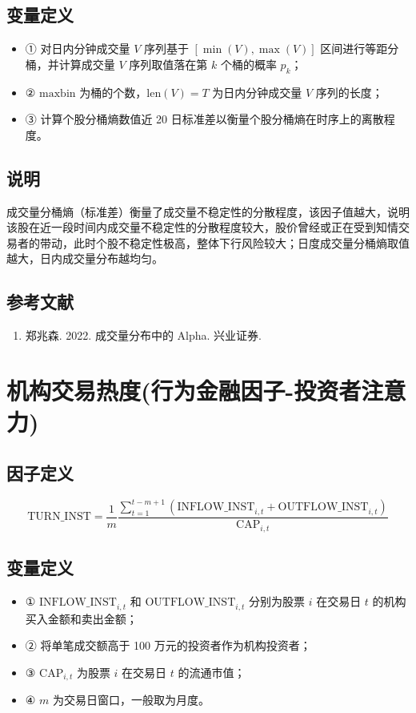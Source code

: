 \documentclass{article}
\begin{document}
\subsection{变量定义}
\begin{itemize}
    \item ① 对日内分钟成交量 \( V \) 序列基于 \([\min(V), \max(V)]\) 区间进行等距分桶，并计算成交量 \( V \) 序列取值落在第 \( k \) 个桶的概率 \( p_k \)；
    \item ② \( \mathrm{maxbin} \) 为桶的个数，\( \mathrm{len}(V) = T \) 为日内分钟成交量 \( V \) 序列的长度；
    \item ③ 计算个股分桶熵数值近 20 日标准差以衡量个股分桶熵在时序上的离散程度。
\end{itemize}

\subsection{说明}
成交量分桶熵（标准差）衡量了成交量不稳定性的分散程度，该因子值越大，说明该股在近一段时间内成交量不稳定性的分散程度较大，股价曾经或正在受到知情交易者的带动，此时个股不稳定性极高，整体下行风险较大；日度成交量分桶熵取值越大，日内成交量分布越均匀。

\subsection{参考文献}
\begin{enumerate}
    \item 郑兆森. 2022. 成交量分布中的 Alpha. 兴业证券.
\end{enumerate}

\section{机构交易热度(行为金融因子-投资者注意力)}

\subsection{因子定义}
\begin{equation}
    \mathrm{TURN\_INST} = \frac{1}{m}\frac{ \sum_{t=1}^{t-m+1} \left( \mathrm{INFLOW\_INST}_{i,t} + \mathrm{OUTFLOW\_INST}_{i,t} \right)}{\mathrm{CAP}_{i,t}}
\end{equation}

\subsection{变量定义}
\begin{itemize}
    \item ① \(\mathrm{INFLOW\_INST}_{i,t}\) 和 \(\mathrm{OUTFLOW\_INST}_{i,t}\) 分别为股票 \(i\) 在交易日 \(t\) 的机构买入金额和卖出金额；
    \item ② 将单笔成交额高于 100 万元的投资者作为机构投资者；
    \item ③ \(\mathrm{CAP}_{i,t}\) 为股票 \(i\) 在交易日 \(t\) 的流通市值；
    \item ④ \(m\) 为交易日窗口，一般取为月度。
\end{itemize}
\end{document}
